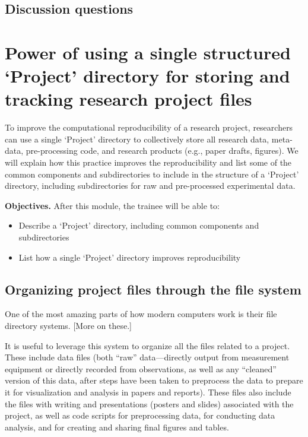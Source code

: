 \documentclass[]{tufte-book}
\providecommand{\tightlist}{%
  \setlength{\itemsep}{0pt}\setlength{\parskip}{0pt}}
\begin{document}
\hypertarget{discussion-questions-1}{%
\subsection{Discussion questions}\label{discussion-questions-1}}

\hypertarget{module6}{%
\section{Power of using a single structured `Project' directory for storing and tracking research project files}\label{module6}}

To improve the computational reproducibility of a research project, researchers
can use a single `Project' directory to collectively store all research data,
meta-data, pre-processing code, and research products (e.g., paper drafts,
figures). We will explain how this practice improves the reproducibility and
list some of the common components and subdirectories to include in the
structure of a `Project' directory, including subdirectories for raw and
pre-processed experimental data.

\textbf{Objectives.} After this module, the trainee will be able to:

\begin{itemize}
\tightlist
\item
  Describe a `Project' directory, including common components and subdirectories
\item
  List how a single `Project' directory improves reproducibility
\end{itemize}

\hypertarget{organizing-project-files-through-the-file-system}{%
\subsection{Organizing project files through the file system}\label{organizing-project-files-through-the-file-system}}

One of the most amazing parts of how modern computers work is their file
directory systems. {[}More on these.{]}

It is useful to leverage this system to organize all the files related to a
project. These include data files (both ``raw'' data---directly output from
measurement equipment or directly recorded from observations, as well as any
``cleaned'' version of this data, after steps have been taken to preprocess the
data to prepare it for visualization and analysis in papers and reports). These
files also include the files with writing and presentations (posters and slides)
associated with the project, as well as code scripts for preprocessing data,
for conducting data analysis, and for creating and sharing final figures and
tables.
\end{document}
